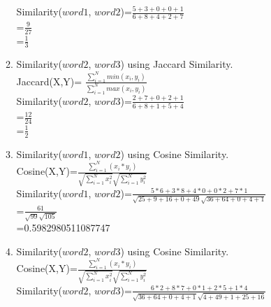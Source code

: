 \documentclass[11pt]{article}
\begin{document}
\begin{enumerate}
\begin{enumerate}
Similarity($word1$, $word2$)=$\frac{5+3+0+0+1}{6+8+4+2+7}$\\

					    =$\frac{9}{27}$\\
					    
					    =$\frac{1}{3}$\\
					    

\item Similarity($word2$, $word3$) using Jaccard Similarity.  \\ 

Jaccard(X,Y)= $\frac{\sum\limits_{i=1}^{N} min(x_i,y_i)}{\sum\limits_{i=1}^{N} max(x_i,y_i)}$\\

Similarity($word2$, $word3$)=$\frac{2+7+0+2+1}{6+8+1+5+4}$\\

					    =$\frac{12}{24}$\\
					    
					    =$\frac{1}{2}$\\
					    

\item Similarity($word1$, $word2$) using Cosine Similarity.  \\ 
Cosine(X,Y)=$\frac{\sum\limits_{i=1}^{N} (x_i * y_i)}{\sqrt{\sum\limits_{i=1}^{N} x_i^2} \sqrt{\sum\limits_{i=1}^{N} y_i^2}}$\\ 

Similarity($word1$, $word2$)=$\frac{5*6 +3*8+4*0+0*2+7*1}{\sqrt{25+9+16+0+49} \sqrt{36+64+0+4+1}}$\\

=$\frac{61}{\sqrt{99} \sqrt{105}}$\\

=0.5982980511087747\\


\item Similarity($word2$, $word3$) using Cosine Similarity.  \\ 

Cosine(X,Y)=$\frac{\sum\limits_{i=1}^{N} (x_i * y_i)}{\sqrt{\sum\limits_{i=1}^{N} x_i^2} \sqrt{\sum\limits_{i=1}^{N} y_i^2}}$\\ 

Similarity($word2$, $word3$)=$\frac{6*2 +8*7+0*1+2*5+1*4}{\sqrt{36+64+0+4+1} \sqrt{4+49+1+25+16}}$\\


\end{enumerate}
\end{enumerate}
\end{document}
